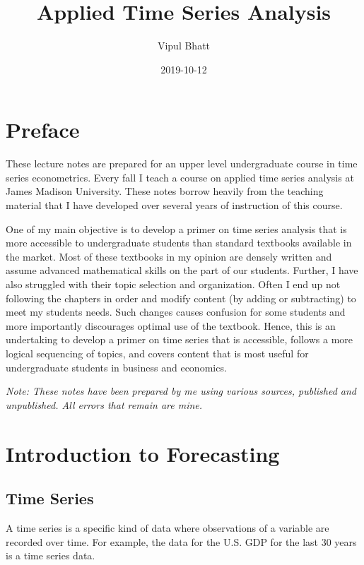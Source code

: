 \documentclass[]{book}
\title{Applied Time Series Analysis}
\author{Vipul Bhatt}
\date{2019-10-12}
\theoremstyle{definition}
\theoremstyle{definition}
\theoremstyle{definition}
\theoremstyle{remark}
\begin{document}
\maketitle

{
\setcounter{tocdepth}{1}
\tableofcontents
}
\hypertarget{preface}{%
\chapter*{Preface}\label{preface}}

These lecture notes are prepared for an upper level undergraduate course in time series econometrics. Every fall I teach a course on applied time series analysis at James Madison University. These notes borrow heavily from the teaching material that I have developed over several years of instruction of this course.

One of my main objective is to develop a primer on time series analysis that is more accessible to undergraduate students than standard textbooks available in the market. Most of these textbooks in my opinion are densely written and assume advanced mathematical skills on the part of our students. Further, I have also struggled with their topic selection and organization. Often I end up not following the chapters in order and modify content (by adding or subtracting) to meet my students needs. Such changes causes confusion for some students and more importantly discourages optimal use of the textbook. Hence, this is an undertaking to develop a primer on time series that is accessible, follows a more logical sequencing of topics, and covers content that is most useful for undergraduate students in business and economics.

\emph{Note: These notes have been prepared by me using various sources, published and unpublished. All errors that remain are mine.}

\hypertarget{intro}{%
\chapter{Introduction to Forecasting}\label{intro}}

\hypertarget{time-series}{%
\section{Time Series}\label{time-series}}

A time series is a specific kind of data where observations of a variable are recorded over time. For example, the data for the U.S. GDP for the last 30 years is a time series data.
\end{document}
